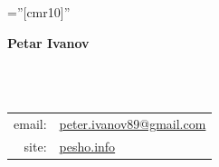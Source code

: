 \documentclass[a4paper,10pt]{article}
\def\name{Petar Ivanov}
\newcommand{\minorcolor}[1]{\textcolor{mygray}{#1}}
\begin{document}
\pagestyle{empty}				%
\font\fb=''[cmr10]''				%

\begin{figure}
	\setlength\fboxsep{0pt}
	\setlength\fboxrule{0.1pt}
        \vspace{-20pt}
\end{figure}

\par{\raggedright\Huge\textbf{\vspace{-3mm}\hspace{0mm}\name}}\\		%
\vspace{-5mm}{\color{linegray}\rule{10.5cm}{0.1mm}}\\

\hspace{4mm}\begin{tabular}{rl}
	\minorcolor{email:} & \href{mailto:peter.ivanov89@gmail.com}{peter.ivanov89@gmail.com}\\
	\minorcolor{site:} & \href{http://pesho.info}{pesho.info}\\
\end{tabular}
\bigskip

\end{document}
